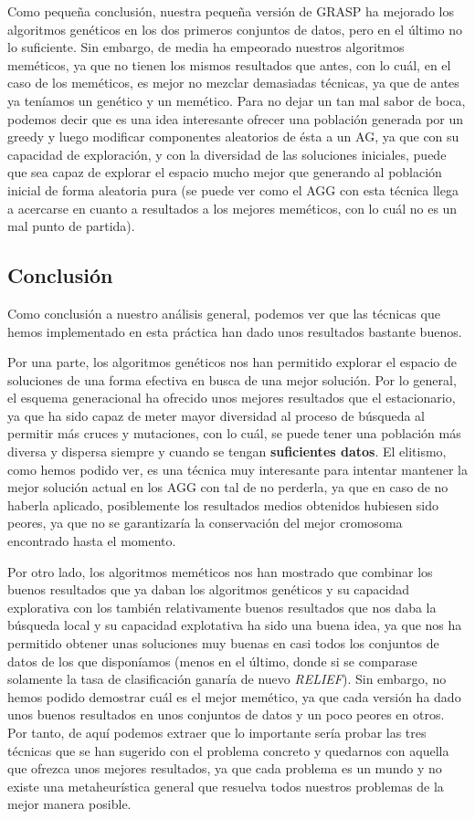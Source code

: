 \documentclass[11pt,a4paper]{article}
\begin{document}
Como pequeña conclusión, nuestra pequeña versión de GRASP ha mejorado los algoritmos genéticos en los dos primeros
conjuntos de datos, pero en el último no lo suficiente. Sin embargo, de media ha empeorado nuestros algoritmos meméticos, ya que
no tienen los mismos resultados que antes, con lo cuál, en el caso de los meméticos, es mejor no mezclar demasiadas técnicas, ya
que de antes ya teníamos un genético y un memético. Para no dejar un tan mal sabor de boca, podemos decir que es una idea
interesante ofrecer una población generada por un greedy y luego modificar componentes aleatorios de ésta a un AG, ya que con
su capacidad de exploración, y con la diversidad de las soluciones iniciales, puede que sea capaz de explorar el espacio
mucho mejor que generando al población inicial de forma aleatoria pura (se puede ver como el AGG con esta técnica llega a
acercarse en cuanto a resultados a los mejores meméticos, con lo cuál no es un mal punto de partida).

\subsection{Conclusión}

Como conclusión a nuestro análisis general, podemos ver que las técnicas que hemos implementado en esta práctica han dado unos
resultados bastante buenos. 

Por una parte, los algoritmos genéticos nos han permitido explorar el espacio de soluciones de una forma efectiva
en busca de una mejor solución. Por lo general, el esquema generacional ha ofrecido unos mejores resultados que el estacionario,
ya que ha sido capaz de meter mayor diversidad al proceso de búsqueda al permitir más cruces y mutaciones, con lo cuál,
se puede tener una población más diversa y dispersa siempre y cuando se tengan \textbf{suficientes datos}. El elitismo, como
hemos podido ver, es una técnica muy interesante para intentar mantener la mejor solución actual en los AGG con tal de no
perderla, ya que en caso de no haberla aplicado, posiblemente los resultados medios obtenidos hubiesen sido peores, ya que
no se garantizaría la conservación del mejor cromosoma encontrado hasta el momento.

Por otro lado, los algoritmos meméticos nos han mostrado que combinar los buenos resultados que ya daban los algoritmos genéticos
y su capacidad explorativa con los también relativamente buenos resultados que nos daba la búsqueda local y su capacidad
explotativa ha sido una buena idea, ya que nos ha permitido obtener unas soluciones muy buenas en casi todos los conjuntos
de datos de los que disponíamos (menos en el último, donde si se comparase solamente la tasa de clasificación ganaría de nuevo
\textit{RELIEF}). Sin embargo, no hemos podido demostrar cuál es el mejor memético, ya que cada versión ha dado unos buenos
resultados en unos conjuntos de datos y un poco peores en otros. Por tanto, de aquí podemos extraer que lo importante sería
probar las tres técnicas que se han sugerido con el problema concreto y quedarnos con aquella que ofrezca unos mejores resultados,
ya que cada problema es un mundo y no existe una metaheurística general que resuelva todos nuestros problemas de la mejor manera
posible.
\end{document}
